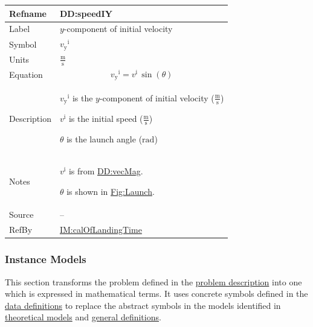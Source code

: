 \documentclass[12pt]{article}
\begin{document}
\medskip
\noindent
\begin{minipage}{\textwidth}
\begin{tabular}{>{\raggedright}p{}>{\raggedright\arraybackslash}p{}}
\toprule \textbf{Refname} & \textbf{DD:speedIY}
\label{DD:speedIY}
\\ \midrule
Label & $y$-component of initial velocity
        
\\ \midrule
Symbol & ${{v_{\text{y}}}^{\text{i}}}$
         
\\ \midrule
Units & $\frac{\text{m}}{\text{s}}$
        
\\ \midrule
Equation & \begin{displaymath}
           {{v_{\text{y}}}^{\text{i}}}={v^{\text{i}}}\,\sin\left(θ\right)
           \end{displaymath}
\\ \midrule
Description & \begin{symbDescription}
              \item{${{v_{\text{y}}}^{\text{i}}}$ is the $y$-component of initial velocity ($\frac{\text{m}}{\text{s}}$)}
              \item{${v^{\text{i}}}$ is the initial speed ($\frac{\text{m}}{\text{s}}$)}
              \item{$θ$ is the launch angle (${\text{rad}}$)}
              \end{symbDescription}
\\ \midrule
Notes & ${v^{\text{i}}}$ is from \hyperref[DD:vecMag]{DD:vecMag}.
        
        $θ$ is shown in \hyperref[Figure:Launch]{Fig:Launch}.
        
\\ \midrule
Source & --
         
\\ \midrule
RefBy & \hyperref[IM:calOfLandingTime]{IM:calOfLandingTime}
        
\\ \bottomrule
\end{tabular}
\end{minipage}

\subsubsection{Instance Models}
\label{Sec:IMs}
This section transforms the problem defined in the \hyperref[Sec:ProbDesc]{problem description} into one which is expressed in mathematical terms. It uses concrete symbols defined in the \hyperref[Sec:DDs]{data definitions} to replace the abstract symbols in the models identified in \hyperref[Sec:TMs]{theoretical models} and \hyperref[Sec:GDs]{general definitions}.
\end{document}
